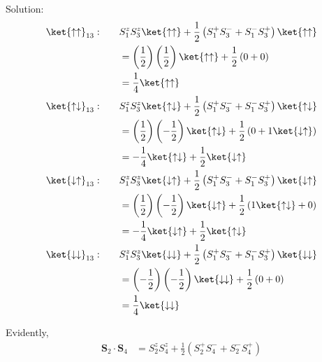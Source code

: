 \begin{homeworkProblem}
\begin{enumerate}[a.]
\begin{callout}{Solution:}
            \begin{align*}
                \ket{\uparrow\uparrow}_{13}:\qquad& S_1^{z}S_3^{z}\ket{\uparrow\uparrow} + \frac{1}{2}\left(S^{+}_1 S^{-}_3 + S^{-}_1 S^{+}_3 \right)\ket{\uparrow\uparrow} \\
                                                  &= \left( \frac{1}{2} \right)\left(\frac{1}{2} \right)\ket{\uparrow\uparrow} + \frac{1}{2}\left(0 + 0 \right) \\
                                                  &= \frac{1}{4}\ket{\uparrow\uparrow} \\
                \ket{\uparrow\downarrow}_{13}:\qquad& S_1^{z}S_3^{z}\ket{\uparrow\downarrow} + \frac{1}{2}\left(S^{+}_1 S^{-}_3 + S^{-}_1 S^{+}_3 \right)\ket{\uparrow\downarrow} \\
                                                    &= \left( \frac{1}{2} \right)\left( -\frac{1}{2} \right)\ket{\uparrow\downarrow} + \frac{1}{2}\left(0 + 1\ket{\downarrow\uparrow} \right) \\
                                                    &= -\frac{1}{4} \ket{\uparrow\downarrow} + \frac{1}{2}\ket{\downarrow\uparrow} \\
                \ket{\downarrow\uparrow}_{13}:\qquad& S_1^{z}S_3^{z}\ket{\downarrow\uparrow} + \frac{1}{2}\left(S^{+}_1 S^{-}_3 + S^{-}_1 S^{+}_3 \right)\ket{\downarrow\uparrow} \\
                                                    &= \left( \frac{1}{2} \right)\left( -\frac{1}{2} \right)\ket{\downarrow\uparrow} + \frac{1}{2}\left( 1\ket{\uparrow\downarrow} + 0 \right) \\
                                                    &= -\frac{1}{4} \ket{\downarrow\uparrow} + \frac{1}{2}\ket{\uparrow\downarrow} \\
                \ket{\downarrow\downarrow}_{13}:\qquad& S_1^{z}S_3^{z}\ket{\downarrow\downarrow} + \frac{1}{2}\left(S^{+}_1 S^{-}_3 + S^{-}_1 S^{+}_3 \right)\ket{\downarrow\downarrow} \\
                                                  &= \left( -\frac{1}{2} \right)\left( -\frac{1}{2} \right)\ket{\downarrow\downarrow} + \frac{1}{2}\left(0 + 0 \right) \\
                                                  &= \frac{1}{4}\ket{\downarrow\downarrow} \\
            \end{align*}

            Evidently,
            \begin{align*}
                \mathbf{S}_2 \cdot \mathbf{S}_4 &= S_2^{z}S_4^{z} + \frac{1}{2}\left(S^{+}_2 S^{-}_4 + S^{-}_2 S^{+}_4 \right) \\
            \end{align*}


\end{callout}
\end{enumerate}
\end{homeworkProblem}
